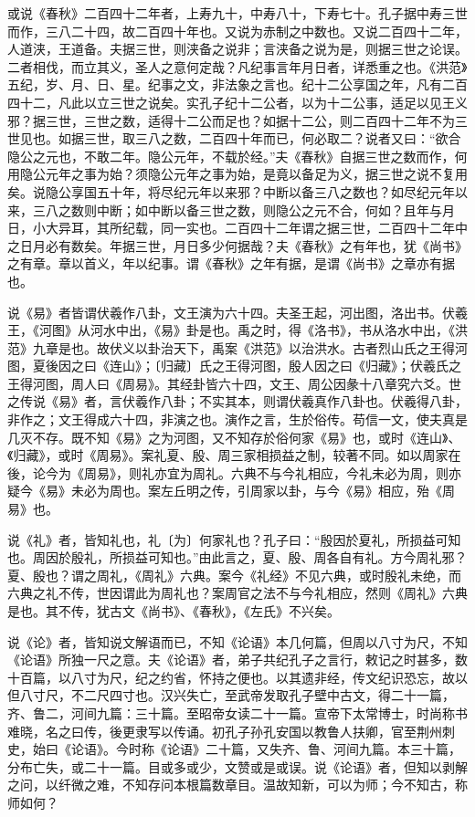 \documentclass[]{article}
\begin{document}
或说《春秋》二百四十二年者，上寿九十，中寿八十，下寿七十。孔子据中寿三世而作，三八二十四，故二百四十年也。又说为赤制之中数也。又说二百四十二年，人道浃，王道备。夫据三世，则浃备之说非；言浃备之说为是，则据三世之论误。二者相伐，而立其义，圣人之意何定哉？凡纪事言年月日者，详悉重之也。《洪范》五纪，岁、月、日、星。纪事之文，非法象之言也。纪十二公享国之年，凡有二百四十二，凡此以立三世之说矣。实孔子纪十二公者，以为十二公事，适足以见王义邪？据三世，三世之数，适得十二公而足也？如据十二公，则二百四十二年不为三世见也。如据三世，取三八之数，二百四十年而已，何必取二？说者又曰：``欲合隐公之元也，不敢二年。隐公元年，不载於经。''夫《春秋》自据三世之数而作，何用隐公元年之事为始？须隐公元年之事为始，是竟以备足为义，据三世之说不复用矣。说隐公享国五十年，将尽纪元年以来邪？中断以备三八之数也？如尽纪元年以来，三八之数则中断；如中断以备三世之数，则隐公之元不合，何如？且年与月日，小大异耳，其所纪载，同一实也。二百四十二年谓之据三世，二百四十二年中之日月必有数矣。年据三世，月日多少何据哉？夫《春秋》之有年也，犹《尚书》之有章。章以首义，年以纪事。谓《春秋》之年有据，是谓《尚书》之章亦有据也。

说《易》者皆谓伏羲作八卦，文王演为六十四。夫圣王起，河出图，洛出书。伏羲王，《河图》从河水中出，《易》卦是也。禹之时，得《洛书》，书从洛水中出，《洪范》九章是也。故伏义以卦治天下，禹案《洪范》以治洪水。古者烈山氏之王得河图，夏後因之曰《连山》；〔归藏〕氏之王得河图，殷人因之曰《归藏》；伏羲氏之王得河图，周人曰《周易》。其经卦皆六十四，文王、周公因彖十八章究六爻。世之传说《易》者，言伏羲作八卦；不实其本，则谓伏羲真作八卦也。伏羲得八卦，非作之；文王得成六十四，非演之也。演作之言，生於俗传。苟信一文，使夫真是几灭不存。既不知《易》之为河图，又不知存於俗何家《易》也，或时《连山》、《归藏》，或时《周易》。案礼夏、殷、周三家相损益之制，较著不同。如以周家在後，论今为《周易》，则礼亦宜为周礼。六典不与今礼相应，今礼未必为周，则亦疑今《易》未必为周也。案左丘明之传，引周家以卦，与今《易》相应，殆《周易》也。

说《礼》者，皆知礼也，礼〔为〕何家礼也？孔子曰：``殷因於夏礼，所损益可知也。周因於殷礼，所损益可知也。''由此言之，夏、殷、周各自有礼。方今周礼邪？夏、殷也？谓之周礼，《周礼》六典。案今《礼经》不见六典，或时殷礼未绝，而六典之礼不传，世因谓此为周礼也？案周官之法不与今礼相应，然则《周礼》六典是也。其不传，犹古文《尚书》、《春秋》，《左氏》不兴矣。

说《论》者，皆知说文解语而已，不知《论语》本几何篇，但周以八寸为尺，不知《论语》所独一尺之意。夫《论语》者，弟子共纪孔子之言行，敕记之时甚多，数十百篇，以八寸为尺，纪之约省，怀持之便也。以其遗非经，传文纪识恐忘，故以但八寸尺，不二尺四寸也。汉兴失亡，至武帝发取孔子壁中古文，得二十一篇，齐、鲁二，河间九篇：三十篇。至昭帝女读二十一篇。宣帝下太常博士，时尚称书难晓，名之曰传，後更隶写以传诵。初孔子孙孔安国以教鲁人扶卿，官至荆州刺史，始曰《论语》。今时称《论语》二十篇，又失齐、鲁、河间九篇。本三十篇，分布亡失，或二十一篇。目或多或少，文赞或是或误。说《论语》者，但知以剥解之问，以纤微之难，不知存问本根篇数章目。温故知新，可以为师；今不知古，称师如何？
\end{document}
